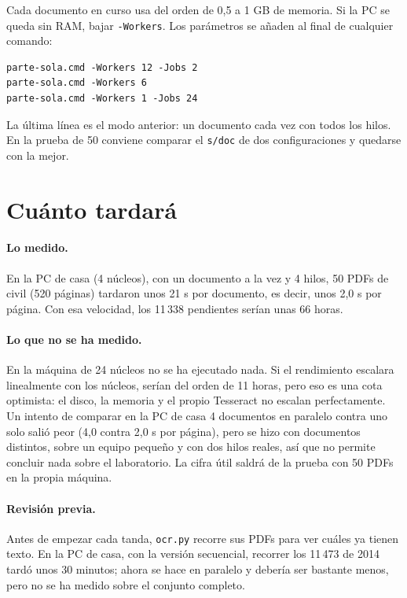 ﻿\documentclass[11pt,a4paper]{article}
\begin{document}
Cada documento en curso usa del orden de 0,5 a 1 GB de memoria. Si la PC se queda sin
RAM, bajar \texttt{-Workers}. Los parámetros se añaden al final de cualquier comando:
\begin{lstlisting}
parte-sola.cmd -Workers 12 -Jobs 2
parte-sola.cmd -Workers 6
parte-sola.cmd -Workers 1 -Jobs 24
\end{lstlisting}
La última línea es el modo anterior: un documento cada vez con todos los hilos. En la
prueba de 50 conviene comparar el \texttt{s/doc} de dos configuraciones y quedarse con la
mejor.

\section{Cuánto tardará}\label{sec:tiempos}

\paragraph{Lo medido.} En la PC de casa (4 núcleos), con un documento a la vez y 4 hilos,
50 PDFs de civil (520 páginas) tardaron unos 21 s por documento, es decir, unos 2,0 s por
página. Con esa velocidad, los 11\,338 pendientes serían unas 66 horas.

\paragraph{Lo que no se ha medido.} En la máquina de 24 núcleos no se ha ejecutado nada. Si
el rendimiento escalara linealmente con los núcleos, serían del orden de 11 horas, pero eso
es una cota optimista: el disco, la memoria y el propio Tesseract no escalan perfectamente.
Un intento de comparar en la PC de casa 4 documentos en paralelo contra uno solo salió peor
(4,0 contra 2,0 s por página), pero se hizo con documentos distintos, sobre un equipo
pequeño y con dos hilos reales, así que no permite concluir nada sobre el laboratorio. La
cifra útil saldrá de la prueba con 50 PDFs en la propia máquina.

\paragraph{Revisión previa.} Antes de empezar cada tanda, \texttt{ocr.py} recorre sus PDFs
para ver cuáles ya tienen texto. En la PC de casa, con la versión secuencial, recorrer
los 11\,473 de 2014 tardó unos 30 minutos; ahora se hace en paralelo y debería ser bastante
menos, pero no se ha medido sobre el conjunto completo.
\end{document}
